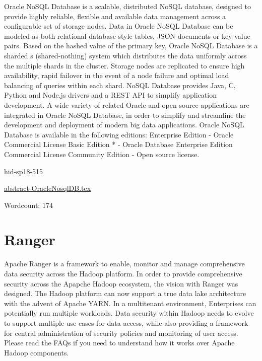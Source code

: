 Oracle NoSQL Database\cite{hid-sp18-515-www-oraclenosql} is a scalable, 
distributed NoSQL database, designed to provide highly reliable, flexible 
and available data management across a configurable set of storage nodes.
Data in Oracle NoSQL Database can be modeled as both relational-database-style 
tables, JSON documents or key-value pairs.
Based on the hashed value of the primary key, Oracle NoSQL Database is 
a sharded s (shared-nothing) system which distributes the data uniformly 
across the multiple shards in the cluster.
Storage nodes are replicated to ensure high availability, rapid failover 
in the event of a node failure and optimal load balancing of queries
within each shard. 
NoSQL Database provides Java, C, Python and Node.js drivers and a 
REST API to simplify application development.
A wide variety of related Oracle and open source applications are 
integrated in Oracle NoSQL Database, in order to simplify and streamline 
the development and deployment of modern big data applications.
Oracle NoSQL Database is available in the following editions: 
Enterprise Edition - Oracle Commercial License
Basic Edition * - Oracle Database Enterprise Edition Commercial 
License
Community Edition - Open source license.


\begin{IU}

hid-sp18-515

\href{https://github.com/cloudmesh-community/hid-sp18-515/blob/master//technology/abstract-OracleNosqlDB.tex}{abstract-OracleNosqlDB.tex}

 

Wordcount: 174

\end{IU}

\section{Ranger}

Apache Ranger\cite{hid-sp18-515-www-ranger} is a framework to enable, 
monitor and manage comprehensive data security across the Hadoop 
platform.
In order to provide comprehensive security across the Apapche Hadoop 
ecosystem, the vision with Ranger was designed.
The Hadoop platform can now support a true data lake architecture with
the advent of Apache YARN.
In a multitenant environment, Enterprises can potentially run multiple 
workloads.
Data security within Hadoop needs to evolve to support multiple use cases 
for data access, while also providing a framework for central 
administration of security policies and monitoring of user access.
Please read the FAQs if you need to understand how it works over 
Apache Hadoop components.


